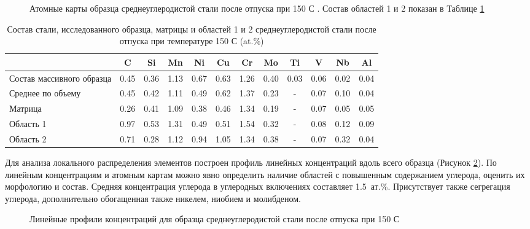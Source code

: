 \begin{figure}[ht]
	\caption{Атомные карты образца среднеуглеродистой стали после отпуска при 150 \textdegree С \cite{scbibRyabov}. Состав областей 1 и 2 показан в Таблице \cref{tab:SteelComposition150} }
	\label{fig:SteelAtomMaps1}
\end{figure} 

\begin{table} [htbp]
	\centering
	\caption{Состав стали, исследованного образца, матрицы и областей 1 и 2 среднеуглеродистой стали после отпуска при температуре 150 \textdegree С (at.\%)}%
	\label{tab:SteelComposition150}%
	\begin{SingleSpace}
		\begin{tabular}{|p{3cm}| c | c | c | c | c | c | c | c | c | c | c |}
			\hline
			& C & Si & Mn & Ni & Cu & Cr & Mo & Ti & V & Nb & Al     \\ \hline
			Состав массивного образца     & 0.45 & 0.36 & 1.13 & 0.67 & 0.63 & 1.26 & 0.40 & 0.03 & 0.06 & 0.02 & 0.04   \\ \hline
			Среднее по объему   & 0.45 & 0.42 & 1.11 & 0.49 & 0.62 & 1.37 & 0.23 & - & 0.07 & 0.10 & 0.04   \\  \hline		
			Матрица   & 0.26 & 0.41 & 1.09 & 0.38 & 0.46 & 1.34 & 0.19 & - & 0.07 & 0.05 & 0.05   \\  \hline	
			Область 1   & 0.97 & 0.53 & 1.31 & 0.49 & 0.51 & 1.54 & 0.32 & - & 0.08 & 0.12 & 0.09   \\  \hline
			Область 2   & 0.71 & 0.28 & 1.12 & 0.94 & 1.05 & 1.34 & 0.38 & - & 0.07 & 0.32 & 0.04   \\  \hline	
		\end{tabular}%
	\end{SingleSpace}
\end{table}

Для анализа локального распределения элементов построен профиль линейных концентраций вдоль всего образца (Рисунок \cref{fig:SteelLinear1}). По линейным концентрациям и атомным картам можно явно определить наличие областей с повышенным содержанием углерода, оценить их морфологию и состав. Средняя концентрация углерода в углеродных включениях составляет 1.5~ат.\%. Присутствует также сегрегация углерода, дополнительно обогащенная также никелем, ниобием и молибденом.

\begin{figure}[ht]
	\caption{Линейные профили концентраций для образца среднеуглеродистой стали после отпуска при 150 \textdegree С \cite{scbibRyabov}}
	\label{fig:SteelLinear1}
\end{figure}

